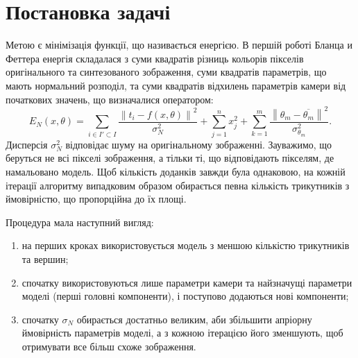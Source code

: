 \section{Постановка задачі}

Метою є мінімізація функції, що називається енергією.
В першій роботі Бланца и Феттера \cite{blanz:romdhani:vetter}
енергія складалася з
суми квадратів різниць кольорів пікселів
оригінального та синтезованого зображення,
суми квадратів параметрів, що мають нормальний розподіл,
та суми квадратів відхилень параметрів камери від початкових значень,
що визначалися оператором:
\begin{equation}\label{eq:energy:blanz}
  E_N\left( x, \theta \right)
  = \sum_{i \in I' \subset I}
      \frac{\left\| t_i - f\left( x, \theta \right) \right\|^2}{\sigma^2_N}
  + \sum_{j = 1}^{n} x_j^2
  + \sum_{k = 1}^{m}
      \frac{\left\| \theta_m - \overline{\theta_m} \right\|^2}
           {\sigma^2_{\theta_m}}.
\end{equation}
Дисперсія $\sigma_N^2$ відповідає шуму на оригінальному зображенні.
Зауважимо, що беруться не всі пікселі зображення,
а тільки ті, що відповідають пікселям, де намальовано модель.
Щоб кількість доданків завжди була однаковою,
на кожній ітерації алгоритму випадковим образом
обирається певна кількість трикутників
з ймовірністю, що пропорційна до їх площі.

Процедура мала наступний вигляд:
\begin{enumerate}
  \item на перших кроках використовується модель
    з меншою кількістю трикутників та вершин;
  \item спочатку використовуються лише параметри камери
    та найзначущі параметри моделі (перші головні компоненти),
    і поступово додаються нові компоненти;
  \item спочатку $\sigma_N$ обирається достатньо великим,
    аби збільшити апріорну ймовірність параметрів моделі,
    а з кожною ітерацією його зменшують,
    щоб отримувати все більш схоже зображення.
\end{enumerate}

